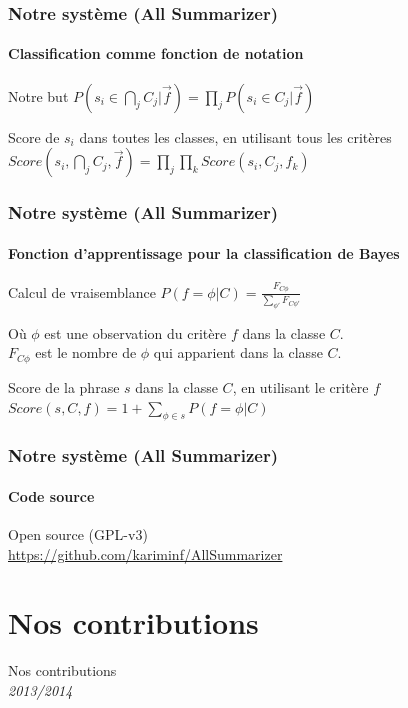 \documentclass{beamer}
\begin{document}
\begin{frame}
\frametitle{Notre système (All Summarizer)}
\framesubtitle{Classification comme fonction de notation}
\begin{block}{Notre but}
$ P(s_i \in \bigcap_{j} C_j | \overrightarrow{f}) = 
\prod_{j} P(s_i \in C_j | \overrightarrow{f}) $
\end{block}
\vfill
\begin{block}{Score de $ s_i $ dans toutes les classes, en utilisant tous les critères}
$ 
Score(s_i , \bigcap_{j} C_j , \overrightarrow{f}) = 
\prod_{j} \prod_{k} Score(s_i , C_j , f_k )
$
\end{block}

\end{frame}

\begin{frame}
\frametitle{Notre système (All Summarizer)}
\framesubtitle{Fonction d'apprentissage pour la classification de Bayes}

\begin{block}{Calcul de vraisemblance}
$ 
P(f = \phi | C) = \frac {F_{C\phi}}{\sum_{\phi'}{F_{C\phi'}}}
$
\end{block}
Où $\phi$ est une observation du critère $ f $ dans la classe $ C $. \\
$F_{C\phi}$ est le nombre de $\phi$ qui apparient dans la classe $ C $.

\vspace{10mm}

\begin{block}{Score de la phrase $ s $ dans la classe $ C $, en utilisant le critère $ f $}
$ 
Score(s , C , f ) = 1 + \sum_{\phi \in s} {P(f=\phi | C)}
$
\end{block}

\end{frame}

\begin{frame}
\frametitle{Notre système (All Summarizer)}
\framesubtitle{Code source}

Open source (GPL-v3) \\
\url{https://github.com/kariminf/AllSummarizer}
\end{frame}

\section{Nos contributions}
\begin{frame}
\begin{center}
{\Huge Nos contributions}\\
{\LARGE \textit{2013/2014}}
\end{center}
\end{frame}
\end{document}
